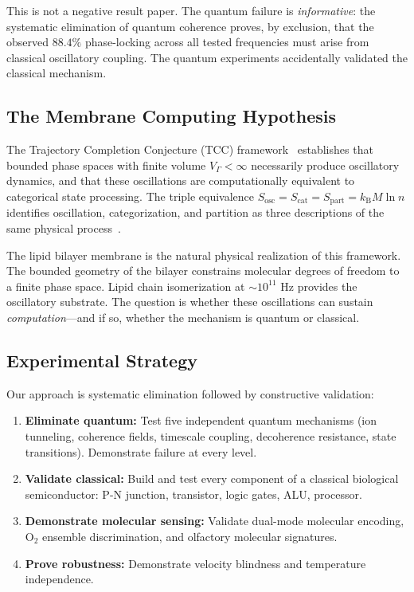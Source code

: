 \documentclass[12pt]{article}
\theoremstyle{definition}
\theoremstyle{remark}
\newcommand{\Sosc}{S_{\mathrm{osc}}}
\newcommand{\Scat}{S_{\mathrm{cat}}}
\newcommand{\Spart}{S_{\mathrm{part}}}
\newcommand{\kB}{k_{\mathrm{B}}}
\newcommand{\Vgamma}{V_\Gamma}
\begin{document}
This is not a negative result paper. The quantum failure is \emph{informative}: the systematic elimination of quantum coherence proves, by exclusion, that the observed $88.4\%$ phase-locking across all tested frequencies must arise from classical oscillatory coupling. The quantum experiments accidentally validated the classical mechanism.

\subsection{The Membrane Computing Hypothesis}

The Trajectory Completion Conjecture (TCC) framework~\citep{sachikonye2026trajectory, sachikonye2026backward} establishes that bounded phase spaces with finite volume $\Vgamma < \infty$ necessarily produce oscillatory dynamics, and that these oscillations are computationally equivalent to categorical state processing. The triple equivalence $\Sosc = \Scat = \Spart = \kB M \ln n$ identifies oscillation, categorization, and partition as three descriptions of the same physical process~\citep{sachikonye2026poincare}.

The lipid bilayer membrane is the natural physical realization of this framework. The bounded geometry of the bilayer constrains molecular degrees of freedom to a finite phase space. Lipid chain isomerization at $\sim 10^{11}$ Hz provides the oscillatory substrate. The question is whether these oscillations can sustain \emph{computation}---and if so, whether the mechanism is quantum or classical.

\subsection{Experimental Strategy}

Our approach is systematic elimination followed by constructive validation:

\begin{enumerate}[leftmargin=2em]
    \item \textbf{Eliminate quantum:} Test five independent quantum mechanisms (ion tunneling, coherence fields, timescale coupling, decoherence resistance, state transitions). Demonstrate failure at every level.
    \item \textbf{Validate classical:} Build and test every component of a classical biological semiconductor: P-N junction, transistor, logic gates, ALU, processor.
    \item \textbf{Demonstrate molecular sensing:} Validate dual-mode molecular encoding, O$_2$ ensemble discrimination, and olfactory molecular signatures.
    \item \textbf{Prove robustness:} Demonstrate velocity blindness and temperature independence.
\end{enumerate}
\end{document}
